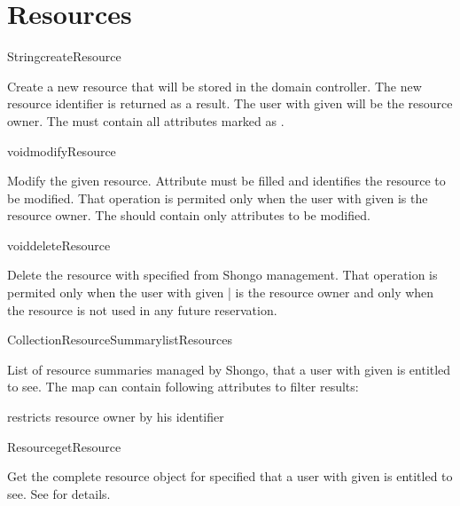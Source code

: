\section{Resources}

\begin{Api}

\begin{ApiCmd}{String}{createResource}%
%
%
\end{ApiCmd}
Create a new resource that will be stored in the domain controller. The new resource identifier is returned as a result. The user with given  will be the resource owner. The  must contain all attributes marked as \ApiRequired.

\begin{ApiCmd}{void}{modifyResource}%
%
%
\end{ApiCmd}
Modify the given resource. Attribute  must be filled and identifies the resource to be modified. That operation is permited only when the user with given  is the resource owner. The  should contain only attributes to be modified.

\begin{ApiCmd}{void}{deleteResource}%
%
%
\end{ApiCmd}
Delete the resource with specified  from Shongo management. That operation is permited only when the user with given | is the resource owner and only when the resource is not used in any future reservation.

\begin{ApiCmdCollection}{Collection}{ResourceSummary}{listResources}%
%
%
\end{ApiCmdCollection}
List of resource summaries managed by Shongo, that a user with given  is entitled to see.
The  map can contain following attributes to filter results:
\begin{compactitem}
\item {} restricts resource owner by his identifier
\end{compactitem}

\begin{ApiCmd}{Resource}{getResource}%
%
%
\end{ApiCmd}
Get the complete resource object for specified  that a user with given  is entitled to see. See  for details.


\end{Api}
